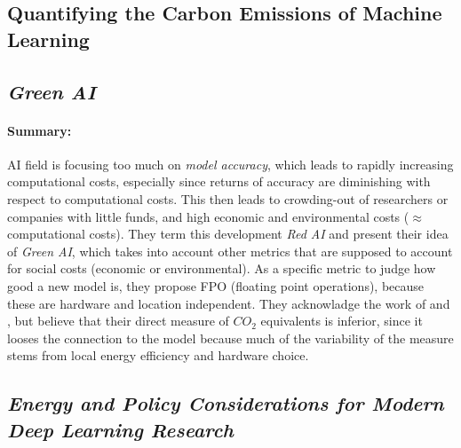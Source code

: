 \documentclass[a4paper, 12pt]{article}
\begin{document}
\subsection{Quantifying the Carbon Emissions of Machine Learning}

\subsection{\textit{Green AI}}
\centerline{}
\vspace{1em}

\paragraph{Summary:} AI field is focusing too much on \emph{model accuracy}, which leads
to rapidly increasing computational costs, especially since returns of accuracy are
diminishing with respect to computational costs. This then leads to crowding-out of
researchers or companies with little funds, and high economic and environmental costs
($\approx$ computational costs). They term this development \emph{Red AI} and present
their idea of \emph{Green AI}, which takes into account other metrics that are supposed
to account for social costs (economic or environmental). As a specific metric to judge
how good a new model is, they propose FPO (floating point operations), because these are
hardware and location independent. They acknowladge the work of 
and , but believe that their direct measure of $CO_2$ equivalents
is inferior, since it looses the connection to the model because much of the variability
of the measure stems from local energy efficiency and hardware choice.

\subsection{\textit{Energy and Policy Considerations for Modern Deep Learning Research}}
\centerline{}
\vspace{1em}
\end{document}
